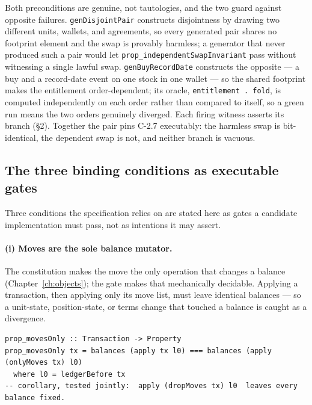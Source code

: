 Both preconditions are genuine, not tautologies, and the two guard against opposite
failures. \texttt{genDisjointPair} constructs disjointness by drawing two different units,
wallets, and agreements, so every generated pair shares no footprint element and the swap
is provably harmless; a generator that never produced such a pair would let
\texttt{prop\_independentSwapInvariant} pass without witnessing a single lawful swap.
\texttt{genBuyRecordDate} constructs the
opposite --- a buy and a record-date event on one stock in one wallet --- so the shared
footprint makes the entitlement order-dependent; its oracle, \texttt{entitlement . fold},
is computed independently on each order rather than compared to itself, so a green run means
the two orders genuinely diverged. Each firing witness asserts its branch (\S 2). Together the
pair pins C-2.7 executably: the harmless swap is bit-identical, the dependent swap is not,
and neither branch is vacuous.

\subsection{The three binding conditions as executable gates}

Three conditions the specification relies on are stated here as gates a candidate
implementation must pass, not as intentions it may assert.

\paragraph{(i) Moves are the sole balance mutator.}
The constitution makes the move the only operation that changes a balance
(Chapter~\ref{ch:objects}); the gate makes that mechanically decidable. Applying a
transaction, then applying only its move list, must leave identical balances --- so a
unit-state, position-state, or terms change that touched a balance is caught as a divergence.

\begin{lstlisting}
prop_movesOnly :: Transaction -> Property
prop_movesOnly tx = balances (apply tx l0) === balances (apply (onlyMoves tx) l0)
  where l0 = ledgerBefore tx
-- corollary, tested jointly:  apply (dropMoves tx) l0  leaves every balance fixed.
\end{lstlisting}


